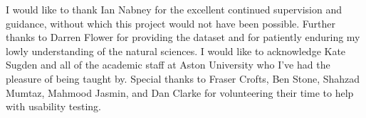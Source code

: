 \thispagestyle{plain}


\begin{center}
  \Large
  \textbf{\@title}

  \vspace{0.4cm}
  \large
  \subtitle{}

  \vspace{0.4cm}
  \@author
\end{center}




\lipsum[1-3]



I would like to thank Ian Nabney for the excellent continued
supervision and guidance, without which this project would not have
been possible. Further thanks to Darren Flower for providing the
dataset and for patiently enduring my lowly understanding of the
natural sciences. I would like to acknowledge Kate Sugden and all of
the academic staff at Aston University who I've had the pleasure of
being taught by. Special thanks to Fraser Crofts, Ben Stone, Shahzad
Mumtaz, Mahmood Jasmin, and Dan Clarke for volunteering their time to
help with usability testing.
